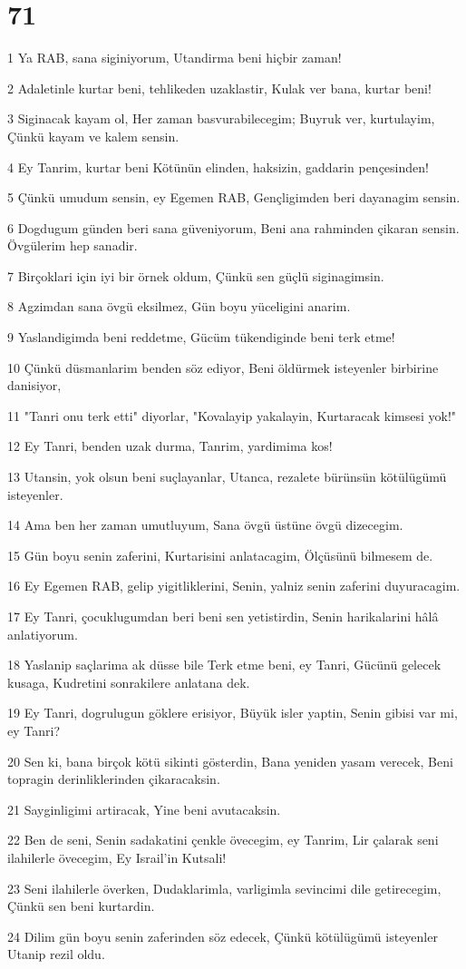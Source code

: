 \chapter{71}

\par 1 Ya RAB, sana siginiyorum, Utandirma beni hiçbir zaman!
\par 2 Adaletinle kurtar beni, tehlikeden uzaklastir, Kulak ver bana, kurtar beni!
\par 3 Siginacak kayam ol, Her zaman basvurabilecegim; Buyruk ver, kurtulayim, Çünkü kayam ve kalem sensin.
\par 4 Ey Tanrim, kurtar beni Kötünün elinden, haksizin, gaddarin pençesinden!
\par 5 Çünkü umudum sensin, ey Egemen RAB, Gençligimden beri dayanagim sensin.
\par 6 Dogdugum günden beri sana güveniyorum, Beni ana rahminden çikaran sensin. Övgülerim hep sanadir.
\par 7 Birçoklari için iyi bir örnek oldum, Çünkü sen güçlü siginagimsin.
\par 8 Agzimdan sana övgü eksilmez, Gün boyu yüceligini anarim.
\par 9 Yaslandigimda beni reddetme, Gücüm tükendiginde beni terk etme!
\par 10 Çünkü düsmanlarim benden söz ediyor, Beni öldürmek isteyenler birbirine danisiyor,
\par 11 "Tanri onu terk etti" diyorlar, "Kovalayip yakalayin, Kurtaracak kimsesi yok!"
\par 12 Ey Tanri, benden uzak durma, Tanrim, yardimima kos!
\par 13 Utansin, yok olsun beni suçlayanlar, Utanca, rezalete bürünsün kötülügümü isteyenler.
\par 14 Ama ben her zaman umutluyum, Sana övgü üstüne övgü dizecegim.
\par 15 Gün boyu senin zaferini, Kurtarisini anlatacagim, Ölçüsünü bilmesem de.
\par 16 Ey Egemen RAB, gelip yigitliklerini, Senin, yalniz senin zaferini duyuracagim.
\par 17 Ey Tanri, çocuklugumdan beri beni sen yetistirdin, Senin harikalarini hâlâ anlatiyorum.
\par 18 Yaslanip saçlarima ak düsse bile Terk etme beni, ey Tanri, Gücünü gelecek kusaga, Kudretini sonrakilere anlatana dek.
\par 19 Ey Tanri, dogrulugun göklere erisiyor, Büyük isler yaptin, Senin gibisi var mi, ey Tanri?
\par 20 Sen ki, bana birçok kötü sikinti gösterdin, Bana yeniden yasam verecek, Beni topragin derinliklerinden çikaracaksin.
\par 21 Sayginligimi artiracak, Yine beni avutacaksin.
\par 22 Ben de seni, Senin sadakatini çenkle övecegim, ey Tanrim, Lir çalarak seni ilahilerle övecegim, Ey Israil'in Kutsali!
\par 23 Seni ilahilerle överken, Dudaklarimla, varligimla sevincimi dile getirecegim, Çünkü sen beni kurtardin.
\par 24 Dilim gün boyu senin zaferinden söz edecek, Çünkü kötülügümü isteyenler Utanip rezil oldu.

